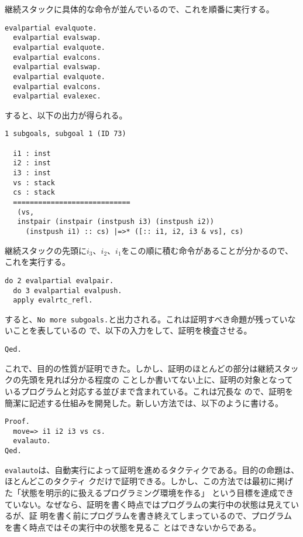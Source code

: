 \documentclass[a4paper, 10pt, twocolumn, titlepage]{ujarticle}
\renewcommand{\{}{\symbol{"7B}}
\renewcommand{\}}{\symbol{"7D}}
\begin{document}
継続スタックに具体的な命令が並んでいるので、これを順番に実行する。

\begin{lstlisting}[style=plain]
  evalpartial evalquote.
  evalpartial evalswap.
  evalpartial evalquote.
  evalpartial evalcons.
  evalpartial evalswap.
  evalpartial evalquote.
  evalpartial evalcons.
  evalpartial evalexec.
\end{lstlisting}

すると、以下の出力が得られる。

\begin{lstlisting}[style=plain]
1 subgoals, subgoal 1 (ID 73)
  
  i1 : inst
  i2 : inst
  i3 : inst
  vs : stack
  cs : stack
  ============================
   (vs,
   instpair (instpair (instpush i3) (instpush i2))
     (instpush i1) :: cs) |=>* ([:: i1, i2, i3 & vs], cs)
\end{lstlisting}

継続スタックの先頭に$i_3$、$i_2$、$i_1$をこの順に積む命令があることが分かるので、これを実行する。

\begin{lstlisting}[style=plain]
  do 2 evalpartial evalpair.
  do 3 evalpartial evalpush.
  apply evalrtc_refl.
\end{lstlisting}

すると、\texttt{No more subgoals.}と出力される。これは証明すべき命題が残っていないことを表しているの
で、以下の入力をして、証明を検査させる。

\begin{lstlisting}[style=plain]
Qed.
\end{lstlisting}

これで、目的の性質が証明できた。しかし、証明のほとんどの部分は継続スタックの先頭を見れば分かる程度の
ことしか書いてない上に、証明の対象となっているプログラムと対応する並びまで含まれている。これは冗長な
ので、証明を簡潔に記述する仕組みを開発した。新しい方法では、以下のように書ける。

\begin{lstlisting}[style=plain]
Proof.
  move=> i1 i2 i3 vs cs.
  evalauto.
Qed.
\end{lstlisting}

\texttt{evalauto}は、自動実行によって証明を進めるタクティクである。目的の命題は、ほとんどこのタクティ
クだけで証明できる。しかし、この方法では最初に掲げた「状態を明示的に扱えるプログラミング環境を作る」
という目標を達成できていない。なぜなら、証明を書く時点ではプログラムの実行中の状態は見えているが、証
明を書く前にプログラムを書き終えてしまっているので、プログラムを書く時点ではその実行中の状態を見るこ
とはできないからである。
\end{document}
